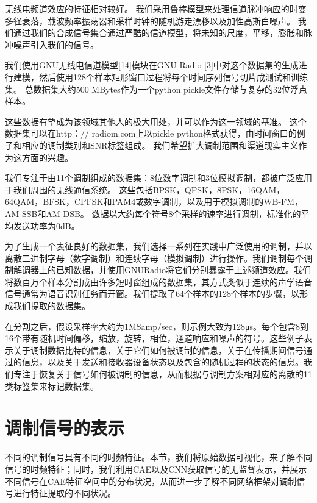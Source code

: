 无线电频道效应的特征相对较好。 我们采用鲁棒模型来处理信道脉冲响应的时变多径衰落，载波频率振荡器和采样时钟的随机游走漂移以及加性高斯白噪声。 我们通过我们的合成信号集合通过严酷的信道模型，将未知的尺度，平移，膨胀和脉冲噪声引入我们的信号。\par

我们使用GNU无线电信道模型[14]模块在GNU Radio [3]中对这个数据集的生成进行建模，然后使用128个样本矩形窗口过程将每个时间序列信号切片成测试和训练集。 总数据集大约500 MBytes作为一个python pickle文件存储与复杂的32位浮点样本。\par

这些数据有望成为该领域其他人的极大用处，并可以作为这一领域的基准。 这个数据集可以在http：// radiom.com上以pickle python格式获得，由时间窗口的例子和相应的调制类别和SNR标签组成。 我们希望扩大调制范围和渠道现实主义作为这方面的兴趣。\par

我们专注于由11个调制组成的数据集：8位数字调制和3位模拟调制，都被广泛应用于我们周围的无线通信系统。 这些包括BPSK，QPSK，8PSK，16QAM，64QAM，BFSK，CPFSK和PAM4或数字调制，以及用于模拟调制的WB-FM，AM-SSB和AM-DSB。 数据以大约每个符号8个采样的速率进行调制，标准化的平均发送功率为0dB。\par

为了生成一个表征良好的数据集，我们选择一系列在实践中广泛使用的调制，并以离散二进制字母（数字调制）和连续字母（模拟调制）进行操作。我们调制每个调制解调器上的已知数据，并使用GNURadio将它们分别暴露于上述频道效应。我们将数百万个样本分割成由许多短时窗组成的数据集，其方式类似于连续的声学语音信号通常为语音识别任务而开窗。我们提取了64个样本的128个样本的步骤，以形成我们提取的数据集。\par

在分割之后，假设采样率大约为1MSamp/sec，则示例大致为128μs。每个包含8到16个带有随机时间偏移，缩放，旋转，相位，通道响应和噪声的符号。这些例子表示关于调制数据比特的信息，关于它们如何被调制的信息，关于在传播期间信号通过的信息，以及关于发送和接收器设备状态以及包含的随机过程的状态的信息。我们专注于恢复关于信号如何被调制的信息，从而根据与调制方案相对应的离散的11类标签集来标记数据集。\par

\section{调制信号的表示}

不同的调制信号具有不同的时频特征。本节，我们将原始数据可视化，来了解不同信号的时频特征；同时，我们利用CAE以及CNN获取信号的无监督表示，并展示不同信号在CAE特征空间中的分布状况，从而进一步了解不同网络框架对调制信号进行特征提取的不同状况。

